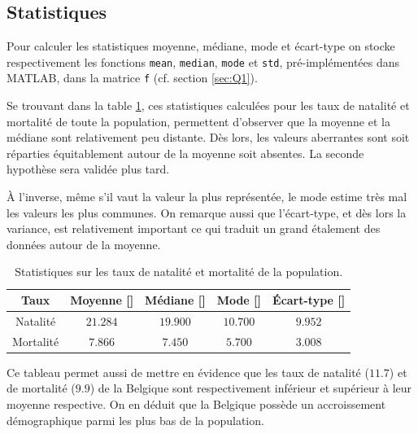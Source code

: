 \documentclass[a4paper, 12pt]{article}
\def\ptsd{\textperthousand}
\begin{document}
	\subsection{Statistiques} \label{sec:Q1b}
	Pour calculer les statistiques moyenne, médiane, mode et écart-type on stocke respectivement les fonctions \texttt{mean}, \texttt{median}, \texttt{mode} et \texttt{std}, pré-implémentées dans \textsc{MATLAB}, dans la matrice \texttt{f} (cf. section \ref{sec:Q1}). \par
	Se trouvant dans la table \ref{table:Q1b}, ces statistiques calculées pour les taux de natalité et mortalité de toute la population, permettent d'observer que la moyenne et la médiane sont relativement peu distante. Dès lors, les valeurs aberrantes sont soit réparties équitablement autour de la moyenne soit absentes. La seconde hypothèse sera validée plus tard. \par
	À l'inverse, même s'il vaut la valeur la plus représentée, le mode estime très mal les valeurs les plus communes. On remarque aussi que l'écart-type, et dès lors la variance, est relativement important ce qui traduit un grand étalement des données autour de la moyenne. \par
	\begin{table}[h]
		\centering
		\begin{tabular}{|c|c|c|c|c|}
			\hline
			  Taux    & Moyenne [\ptsd] & Médiane [\ptsd] &  Mode [\ptsd]  & Écart-type [\ptsd] \\ \hline\hline
			Natalité  & $\num{21.284}$  & $\num{19.900}$  & $\num{10.700}$ &   $\num{9.952}$    \\ \hline
			Mortalité &  $\num{7.866}$  &  $\num{7.450}$  & $\num{5.700}$  &   $\num{3.008}$    \\ \hline
		\end{tabular}
		\caption{Statistiques sur les taux de natalité et mortalité de la population.}
		\label{table:Q1b}
	\end{table}
	Ce tableau permet aussi de mettre en évidence que les taux de natalité ($\num{11.7}$) et de mortalité ($\num{9.9}$) de la Belgique sont respectivement inférieur et supérieur à leur moyenne respective. On en déduit que la Belgique possède un accroissement démographique parmi les plus bas de la population.
\end{document}
